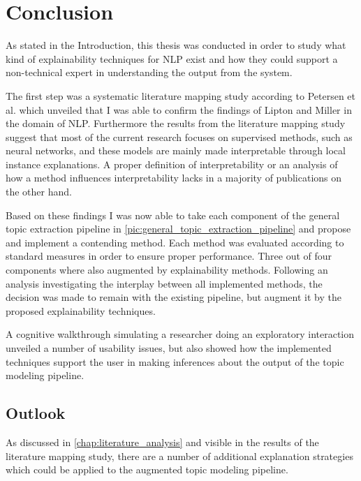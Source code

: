 %
\chapter{Conclusion}
\label{chap:conclusion}

As stated in the Introduction, this thesis was conducted in order to study what kind of explainability techniques for NLP exist and how they could support a non-technical expert in understanding the output from the system.

The first step was a systematic literature mapping study according to Petersen et al. \cite{petersenSystematicMappingStudies} which unveiled that I was able to confirm the findings of Lipton \cite{liptonMythosModelInterpretability2016a} and Miller \cite{millerExplanationArtificialIntelligence2017} in the domain of NLP.
Furthermore the results from the literature mapping study suggest that most of the current research focuses on supervised methods, such as neural networks, and these models are mainly made interpretable through local instance explanations. A proper definition of interpretability or an analysis of how a method influences interpretability lacks in a majority of publications on the other hand.

Based on these findings I was now able to take each component of the general topic extraction pipeline in \autoref{pic:general_topic_extraction_pipeline} and propose and implement a contending method. Each method was evaluated according to standard measures in order to ensure proper performance. Three out of four components where also augmented by explainability methods.
Following an analysis investigating the interplay between all implemented methods, the decision was made to remain with the existing pipeline, but augment it by the proposed explainability techniques.

A cognitive walkthrough simulating a researcher doing an exploratory interaction unveiled a number of usability issues, but also showed how the implemented techniques support the user in making inferences about the output of the topic modeling pipeline.  

\section{Outlook}   
As discussed in \autoref{chap:literature_analysis} and visible in the results of the literature mapping study, there are a number of additional explanation strategies which could be applied to the augmented topic modeling pipeline.

